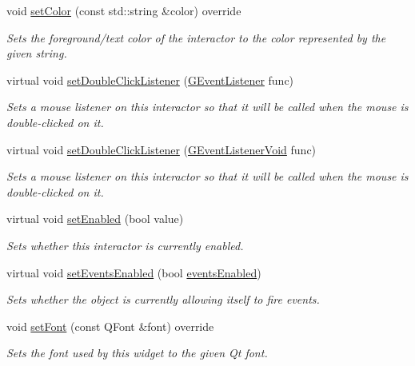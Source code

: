 \begin{DoxyCompactItemize}
void \mbox{\hyperlink{classsgl_1_1GLabel_a56845b1accc47aa881d05939eef6996c}{set\+Color}} (const std\+::string \&color) override
\begin{DoxyCompactList}\small\item\em Sets the foreground/text color of the interactor to the color represented by the given string. \end{DoxyCompactList}\item 
virtual void \mbox{\hyperlink{classsgl_1_1GInteractor_ac29f9a3462458e165fae3a1f046ee77a}{set\+Double\+Click\+Listener}} (\mbox{\hyperlink{namespacesgl_ae9f3e9eab70035da1a2b114e21357b25}{G\+Event\+Listener}} func)
\begin{DoxyCompactList}\small\item\em Sets a mouse listener on this interactor so that it will be called when the mouse is double-\/clicked on it. \end{DoxyCompactList}\item 
virtual void \mbox{\hyperlink{classsgl_1_1GInteractor_a50096194d66f48c92dd4c512d41bfc76}{set\+Double\+Click\+Listener}} (\mbox{\hyperlink{namespacesgl_a54427ce97bb1c2804e4fe2b0a62e8b17}{G\+Event\+Listener\+Void}} func)
\begin{DoxyCompactList}\small\item\em Sets a mouse listener on this interactor so that it will be called when the mouse is double-\/clicked on it. \end{DoxyCompactList}\item 
virtual void \mbox{\hyperlink{classsgl_1_1GInteractor_ab831367dd84bbd579e02e55bacb21343}{set\+Enabled}} (bool value)
\begin{DoxyCompactList}\small\item\em Sets whether this interactor is currently enabled. \end{DoxyCompactList}\item 
virtual void \mbox{\hyperlink{classsgl_1_1GObservable_afaa30b2a9e0f378fd1c70d2f1d0b8216}{set\+Events\+Enabled}} (bool \mbox{\hyperlink{classsgl_1_1GInteractor_a597a370b592e3737d38d9d2f4e2031ea}{events\+Enabled}})
\begin{DoxyCompactList}\small\item\em Sets whether the object is currently allowing itself to fire events. \end{DoxyCompactList}\item 
void \mbox{\hyperlink{classsgl_1_1GLabel_ad1d75b3840a41ba7d1e8a921696dc684}{set\+Font}} (const Q\+Font \&font) override
\begin{DoxyCompactList}\small\item\em Sets the font used by this widget to the given Qt font. \end{DoxyCompactList}\item 

\end{DoxyCompactItemize}
